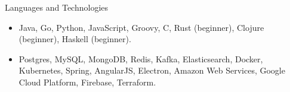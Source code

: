 \documentclass[]{cv}
\begin{document}
	\begin{cvsection}{Languages and Technologies}
		\begin{cvsubsection}{}{}{}	
			\begin{itemize}
				\item Java, Go, Python, JavaScript, Groovy, C, Rust (beginner), Clojure (beginner), Haskell (beginner).
				\item Postgres, MySQL, MongoDB, Redis, Kafka, Elasticsearch, Docker, Kubernetes, Spring, AngularJS, Electron, Amazon Web Services, Google Cloud Platform, Firebase, Terraform.
			\end{itemize}
		\end{cvsubsection}
	\end{cvsection}
	
\end{document}
